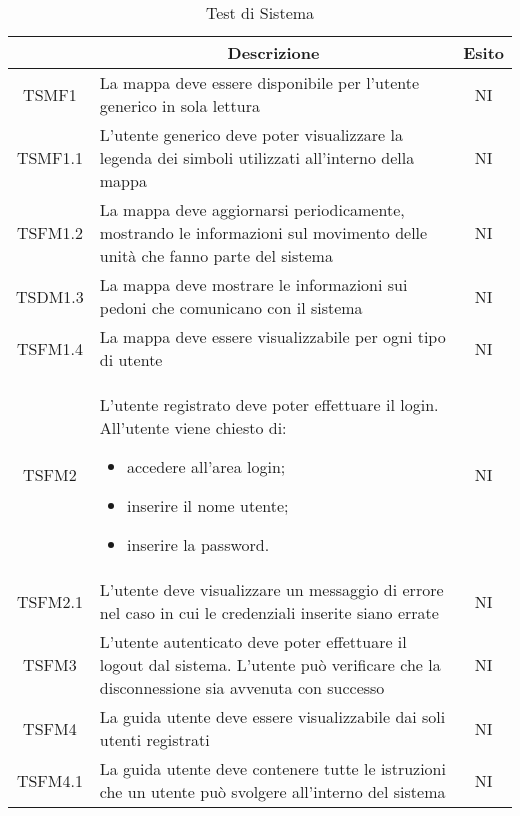 	\newcommand*{\thead}[1]{\multicolumn{1}{c}{\bfseries #1}}
	\setlength{\tabcolsep}{10pt}
	\begin{longtable}[h!] { c  m{12cm} c}
		\caption{Test di Sistema} \\
		\rowcolor{lightgray}
		\thead{Test}  & \thead{Descrizione} & \thead{Esito} \\ \endhead%

		TSMF1   & La mappa deve essere disponibile per l'utente generico in sola lettura	& NI \\

		TSMF1.1 & L'utente generico deve poter visualizzare la legenda dei simboli utilizzati all'interno della mappa & NI \\

		TSFM1.2 & La mappa deve aggiornarsi periodicamente, mostrando le informazioni sul movimento delle unità che fanno parte del sistema & NI\\

		TSDM1.3 & La mappa deve mostrare le informazioni sui pedoni che comunicano con il sistema & NI \\

		TSFM1.4 & La mappa deve essere visualizzabile per ogni tipo di utente & NI\\


		TSFM2   & L'utente registrato deve poter effettuare il login. All'utente viene chiesto di:
				\begin{itemize}
					\item accedere all'area login;
					\item inserire il nome utente;
					\item inserire la password.
				\end{itemize}
								& NI \\

		TSFM2.1 & L'utente deve visualizzare un messaggio di errore nel caso in cui le credenziali inserite siano errate & NI \\
		
		TSFM3   & L'utente autenticato deve poter effettuare il logout dal sistema. L'utente può verificare che la disconnessione sia avvenuta con successo & NI \\

		TSFM4   & La guida utente deve essere visualizzabile dai soli utenti registrati & NI \\

		TSFM4.1 & La guida utente deve contenere tutte le istruzioni che un utente può svolgere all'interno del sistema & NI \\


\end{longtable}
